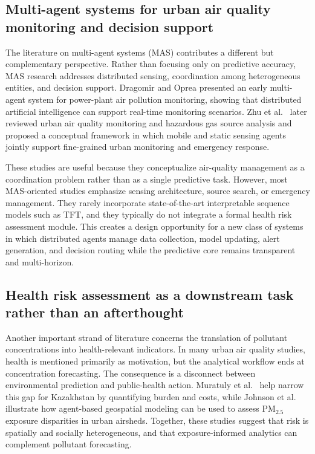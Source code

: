 \documentclass[pdflatex,sn-mathphys-num]{sn-jnl}
\begin{document}
\subsection{Multi-agent systems for urban air quality monitoring and decision support}\label{subsec:mas}

The literature on multi-agent systems (MAS) contributes a different but complementary perspective. Rather than focusing only on predictive accuracy, MAS research addresses distributed sensing, coordination among heterogeneous entities, and decision support. Dragomir and Oprea \cite{dragomir2013mas} presented an early multi-agent system for power-plant air pollution monitoring, showing that distributed artificial intelligence can support real-time monitoring scenarios. Zhu et al.\ \cite{zhu2021multisensing} later reviewed urban air quality monitoring and hazardous gas source analysis and proposed a conceptual framework in which mobile and static sensing agents jointly support fine-grained urban monitoring and emergency response.

These studies are useful because they conceptualize air-quality management as a coordination problem rather than as a single predictive task. However, most MAS-oriented studies emphasize sensing architecture, source search, or emergency management. They rarely incorporate state-of-the-art interpretable sequence models such as TFT, and they typically do not integrate a formal health risk assessment module. This creates a design opportunity for a new class of systems in which distributed agents manage data collection, model updating, alert generation, and decision routing while the predictive core remains transparent and multi-horizon.

\subsection{Health risk assessment as a downstream task rather than an afterthought}\label{subsec:health}

Another important strand of literature concerns the translation of pollutant concentrations into health-relevant indicators. In many urban air quality studies, health is mentioned primarily as motivation, but the analytical workflow ends at concentration forecasting. The consequence is a disconnect between environmental prediction and public-health action. Muratuly et al.\ \cite{muratuly2025health} help narrow this gap for Kazakhstan by quantifying burden and costs, while Johnson et al.\ \cite{johnson2025agent} illustrate how agent-based geospatial modeling can be used to assess PM$_{2.5}$ exposure disparities in urban airsheds. Together, these studies suggest that risk is spatially and socially heterogeneous, and that exposure-informed analytics can complement pollutant forecasting.
\end{document}
